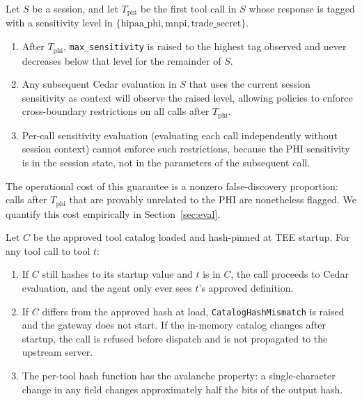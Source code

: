 \begin{property}
\label{prop:session-sensitivity}
Let $S$ be a session, and let $T_{\text{phi}}$ be the first tool call in $S$ whose
response is tagged with a sensitivity level in
$\{\text{hipaa\_phi}, \text{mnpi}, \text{trade\_secret}\}$.
\begin{enumerate}[leftmargin=1.5em,label=(\alph*)]
  \item After $T_{\text{phi}}$, \texttt{max\_sensitivity} is raised to the highest tag
    observed and never decreases below that level for the remainder of $S$.
  \item Any subsequent Cedar evaluation in $S$ that uses the current session sensitivity as
    context will observe the raised level, allowing policies to enforce cross-boundary
    restrictions on all calls after $T_{\text{phi}}$.
  \item Per-call sensitivity evaluation (evaluating each call independently without session
    context) cannot enforce such restrictions, because the PHI sensitivity is in the session
    state, not in the parameters of the subsequent call.
\end{enumerate}
The operational cost of this guarantee is a nonzero false-discovery proportion: calls after
$T_{\text{phi}}$ that are provably unrelated to the PHI are nonetheless flagged.
We quantify this cost empirically in Section~\ref{sec:eval}.
\end{property}

\begin{property}
\label{prop:rug-pull}
Let $C$ be the approved tool catalog loaded and hash-pinned at TEE startup. For any tool
call to tool $t$:
\begin{enumerate}[leftmargin=1.5em,label=(\alph*)]
  \item If $C$ still hashes to its startup value and $t$ is in $C$, the call proceeds to
    Cedar evaluation, and the agent only ever sees $t$'s approved definition.
  \item If $C$ differs from the approved hash at load, \texttt{CatalogHashMismatch} is
    raised and the gateway does not start. If the in-memory catalog changes after startup,
    the call is refused before dispatch and is not propagated to the upstream server.
  \item The per-tool hash function has the avalanche property: a single-character change
    in any field changes approximately half the bits of the output hash.
\end{enumerate}
\end{property}

